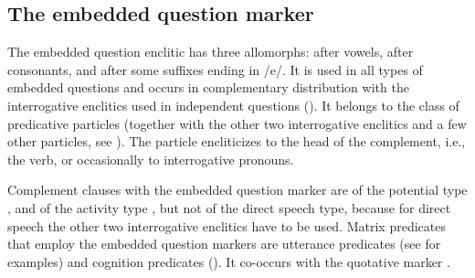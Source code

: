 
\subsection{The embedded question marker}
\label{ssec:The embedded question marker}

The embedded question enclitic has three allomorphs:  after vowels,  after consonants, and  after some suffixes ending in /e/. It is used in all types of embedded questions and occurs in complementary distribution with the interrogative enclitics used in independent questions (). It belongs to the class of predicative particles (together with the other two interrogative enclitics and a few other particles, see ). The particle encliticizes to the head of the complement, i.e., the verb, or occasionally to interrogative pronouns. 

Complement clauses with the embedded question marker are of the potential type ,  and of the activity type , but not of the direct speech type, because for direct speech the other two interrogative enclitics have to be used. Matrix predicates that employ the embedded question markers are utterance predicates (see  for examples) and cognition predicates (). It co-occurs with the quotative marker .


